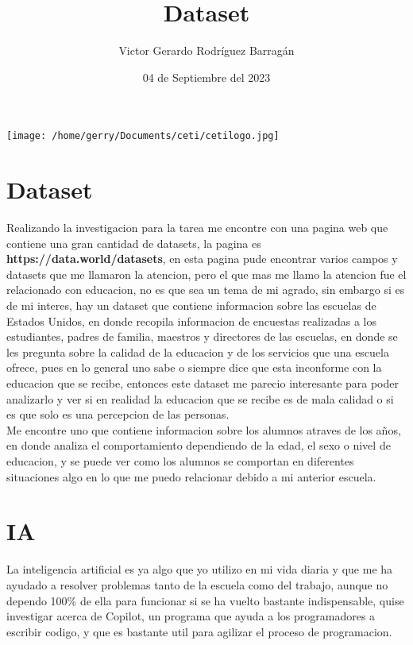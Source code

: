 \documentclass{article}
\title{Dataset}
\author{Victor Gerardo Rodríguez Barragán}
\date{04 de Septiembre del 2023}
\begin{document}
\maketitle
\begin{center}
    \texttt{[image: /home/gerry/Documents/ceti/cetilogo.jpg]}
\end{center}
\newpage
\justify

\section{Dataset}
Realizando la investigacion para la tarea me encontre con una pagina web que contiene
una gran cantidad de datasets, la pagina es \textbf{https://data.world/datasets}, en esta pagina
pude encontrar varios campos y datasets que me llamaron la atencion, pero el que mas me llamo la atencion
fue el relacionado con educacion, no es que sea un tema de mi agrado, sin embargo si es de
mi interes, hay un dataset que contiene informacion sobre las escuelas de Estados Unidos,
en donde recopila informacion de encuestas realizadas a los estudiantes, padres de familia,
maestros y directores de las escuelas, en donde se les pregunta sobre la calidad de la educacion
y de los servicios que una escuela ofrece, pues en lo general uno sabe o siempre dice
que esta inconforme con la educacion que se recibe, entonces este dataset me parecio interesante
para poder analizarlo y ver si en realidad la educacion que se recibe es de mala calidad o
si es que solo es una percepcion de las personas.
\vspace{0.5cm}\\
Me encontre uno que contiene informacion sobre los alumnos atraves de los años, en donde analiza
el comportamiento dependiendo de la edad, el sexo o nivel de educacion, y se puede ver como
los alumnos se comportan en diferentes situaciones algo en lo que me puedo relacionar debido
a mi anterior escuela.

\section{IA}
La inteligencia artificial es ya algo que yo utilizo en mi vida diaria y que me ha ayudado
a resolver problemas tanto de la escuela como del trabajo, aunque no dependo 100\% de ella para
funcionar si se ha vuelto bastante indispensable, quise investigar acerca de Copilot, un
programa que ayuda a los programadores a escribir codigo, y que es bastante util para
agilizar el proceso de programacion.
\end{document}
